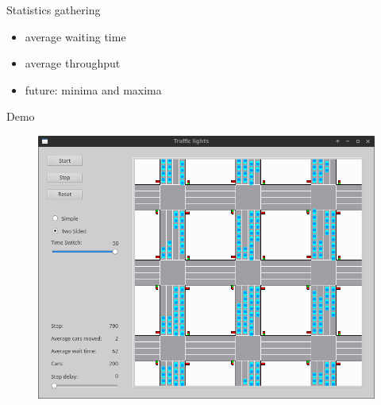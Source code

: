 \documentclass[11pt]{beamer}
\begin{document}
\begin{frame}{Statistics gathering}
\begin{itemize}
\item average waiting time
\item average throughput
\item future: minima and maxima
\end{itemize}
\end{frame}

\begin{frame}{Demo}
\begin{figure}
\centering
\includegraphics[width=.8\textwidth]{vertical.png}
\end{figure}
\end{frame}
\end{document}
